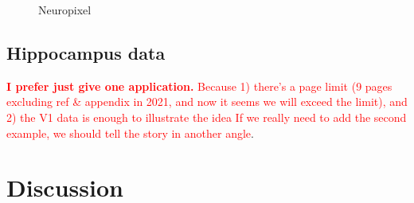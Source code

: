 \documentclass{article}
\begin{document}
\begin{figure}[h!]
		\caption{Neuropixel}
	\end{figure}
	
	\subsection{Hippocampus data}
	
	\textcolor{red}{\textbf{I prefer just give one application.} Because 1) there's a page limit (9 pages excluding ref \& appendix in 2021, and now it seems we will exceed the limit), and 2) the V1 data is enough to illustrate the idea If we really need to add the second example, we should tell the story in another angle}.
	
	\section{Discussion}
	
\end{document}
